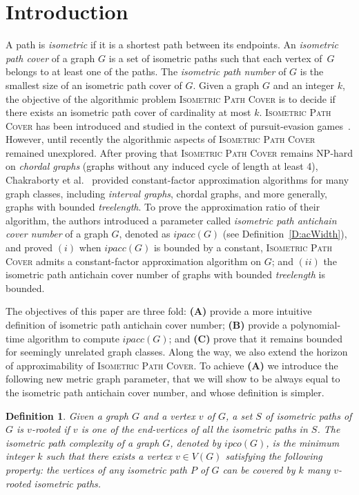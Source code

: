 \documentclass[a4paper]{article}
\newcommand{\IPC}{\textsc{Isometric Path Cover}\xspace}
\newcommand{\ipac}[1]{ipacc\left(#1\right)}
\newcommand{\ipco}[1]{ipco\left(#1\right)}
\newtheorem{definition}[theorem]{Definition}
\begin{document}
\section{Introduction}

A path is \emph{isometric} if it is a shortest path between its endpoints.  An \emph{isometric path cover} of a graph $G$ is a set of isometric paths such that each vertex of~$G$ belongs to at least one of the paths. The \emph{isometric path number} of $G$ is the smallest size of an isometric path cover of $G$. Given a graph $G$ and an integer $k$, the objective of {the algorithmic problem} \IPC is to decide if there exists an isometric path cover of cardinality at most $k$. \IPC has been {introduced} and studied in the context of pursuit-evasion games~\cite{cop-decs,AF84}. However, until recently the algorithmic aspects of \IPC remained unexplored. After proving that \IPC remains NP-hard on \emph{chordal graphs} (graphs without any induced cycle of length at least 4), Chakraborty et al.~\cite{ChakrabortyD0FG22} provided constant-factor approximation algorithms for many graph classes, including \emph{interval graphs}, chordal graphs, and more generally, graphs with bounded \emph{treelength}. To prove the approximation ratio of their algorithm, the authors introduced a parameter called \emph{isometric path antichain cover number} of a graph $G$, denoted as $\ipac{G}$ (see Definition~\ref{D:acWidth}), and proved $(i)$ when $\ipac{G}$ is bounded by a constant, \IPC admits a constant-factor approximation algorithm on $G$; and $(ii)$ the isometric path antichain cover number of graphs with bounded \emph{treelength} is bounded. 

The objectives of this paper are three fold: \textbf{(A)} provide a more intuitive definition of isometric path antichain cover number; \textbf{(B)} provide a polynomial-time algorithm to compute $\ipac{G}$; and \textbf{(C)} prove that it remains bounded for seemingly unrelated graph classes.  Along the way, we also extend the horizon of approximability of \IPC. To achieve \textbf{(A)} we introduce the following new metric graph parameter, that we will show to be always equal to the isometric path antichain cover number, and whose definition is simpler. %




\begin{definition}\label{D:ipco}
    Given a graph $G$ and a vertex $v$ of 
    $G$, a set $S$ of isometric paths of $G$ is \emph{$v$-rooted} if $v$ is one of the end-vertices of all the isometric paths in $S$. The \emph{isometric path complexity} of a graph $G$, denoted by $\ipco{G}$, is the minimum integer $k$ such that there exists a vertex $v\in V(G)$ satisfying the following property: the vertices of any isometric path $P$ of $G$ can be covered by $k$ many $v$-rooted isometric paths.
\end{definition}
\end{document}
